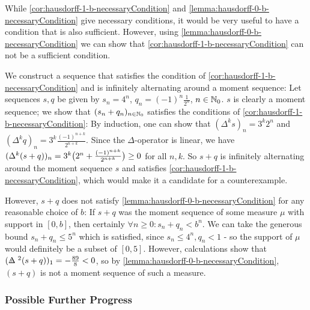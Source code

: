 \documentclass[a4paper]{scrreprt}
\begin{document}
    While \ref{cor:hausdorff-1-b-necessaryCondition} and \ref{lemma:hausdorff-0-b-necessaryCondition} give necessary conditions, it would be very useful to have a condition that is also sufficient. However, using \ref{lemma:hausdorff-0-b-necessaryCondition} we can show that \ref{cor:hausdorff-1-b-necessaryCondition} can not be a sufficient condition.
    
    \begin{ex}
        We construct a sequence that satisfies the condition of \ref{cor:hausdorff-1-b-necessaryCondition} and is infinitely alternating around a moment sequence:
        Let sequences $s, q$ be given by $s_n = 4^n$, $q_n = (-1)^n\frac{1}{2^n}$, $n \in \mathbb{N}_0$. $s$ is clearly a moment sequence; we show that $(s_n + q_n)_{n \in \mathbb{N}_0}$ satisfies the conditions of \ref{cor:hausdorff-1-b-necessaryCondition}:
        By induction, one can show that $(\Delta^k s)_n = 3^k 2^n$ and $(\Delta^k q)_n = 3^k\frac{(-1)^{n+k}}{2^{n+k}}$.
        Since the $\Delta$-operator is linear, we have $(\Delta^k (s+q))_n = 3^k\bigl(2^n + \frac{(-1)^{n+k}}{2^{n+k}}\bigr) \geq 0$ for all $n, k$.
        So $s+q$ is infinitely alternating around the moment sequence $s$ and satisfies \ref{cor:hausdorff-1-b-necessaryCondition}, which would make it a candidate for a counterexample.
        
        However, $s+q$ does not satisfy \ref{lemma:hausdorff-0-b-necessaryCondition} for any reasonable choice of $b$:
        If $s+q$ was the moment sequence of some measure $\mu$ with support in $[0, b]$, then certainly $\forall n \geq 0: s_n + q_n < b^n$.
        We can take the generous bound $s_n + q_n \leq 5^n$ which is satisfied, since $s_n \leq 4^n, q_n < 1$ - so the support of $\mu$ would definitely be a subset of $[0, 5]$.
        However, calculations show that $(\DeltaB{5}^2 (s+q))_1 = -\frac{89}{8} < 0$, so by \ref{lemma:hausdorff-0-b-necessaryCondition}, $(s+q)$ is not a moment sequence of such a measure.
    \end{ex}

    \subsubsection{Possible Further Progress}
\end{document}
